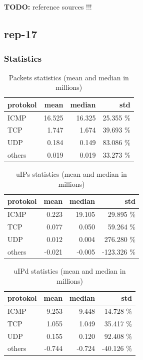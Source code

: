 \textbf{TODO: }reference sources !!!

\subsection*{rep-17}
\subsubsection*{Statistics}
\begin{table}[H]
\center
\begin{tabular}{lrrr}
\toprule
protokol & mean & median & std \\
\midrule
ICMP &   16.525  &  16.325  &  25.355 \% \\
TCP &     1.747  &   1.674  &  39.693 \% \\
UDP &     0.184  &   0.149  &  83.086 \% \\
others &  0.019  &   0.019  &  33.273 \% \\
\end{tabular}
\caption{Packets statistics (mean and median in millions)}
\label{tab:proto-stats-packets}
\end{table}

\begin{table}[H]
\center
\begin{tabular}{lrrr}
\toprule
protokol & mean & median & std \\
\midrule
ICMP &    0.223 & 19.105 &   29.895 \% \\
TCP &     0.077 &  0.050 &   59.264 \% \\
UDP &     0.012 &  0.004 &  276.280 \% \\
others & -0.021 & -0.005 & -123.326 \% \\
\end{tabular}
\caption{uIPs statistics (mean and median in millions)}
\label{tab:proto-stats-uIPs}
\end{table}

\begin{table}[H]
\center
\begin{tabular}{lrrr}
\toprule
protokol & mean & median & std \\
\midrule
ICMP &    9.253 &  9.448 &  14.728 \%  \\
TCP &     1.055 &  1.049 &  35.417 \%  \\
UDP &     0.155 &  0.120 &  92.408 \%  \\
others & -0.744 & -0.724 & -40.126 \%  \\
\end{tabular}
\caption{uIPd statistics (mean and median in millions)}
\label{tab:proto-stats-uIPd}
\end{table}
